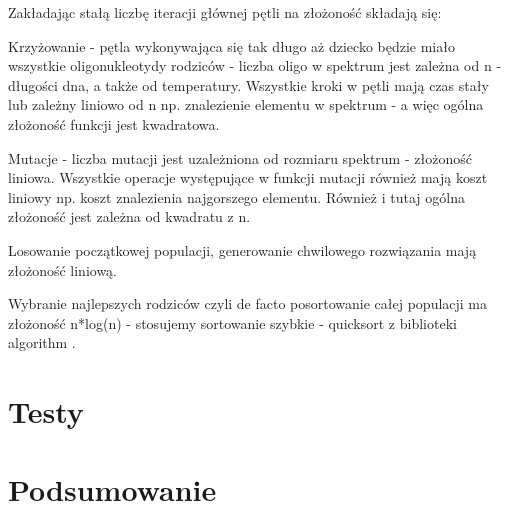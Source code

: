 \documentclass{article}
\begin{document}
Zakładając stałą liczbę iteracji głównej pętli na złożoność składają się:


Krzyżowanie - pętla wykonywająca się tak długo aż dziecko będzie miało
wszystkie oligonukleotydy rodziców - liczba oligo w spektrum jest zależna
od n - długości dna, a także od temperatury. Wszystkie kroki w pętli mają
czas stały lub zależny liniowo od n np. znalezienie elementu w spektrum -
a więc ogólna złożoność funkcji jest kwadratowa.


Mutacje - liczba mutacji jest uzależniona od rozmiaru spektrum - złożoność liniowa. Wszystkie operacje występujące w funkcji mutacji również
mają koszt liniowy np. koszt znalezienia najgorszego elementu. Również i tutaj ogólna złożoność jest zależna od kwadratu z n.
        
        
Losowanie początkowej populacji, generowanie chwilowego rozwiązania mają złożoność liniową.


Wybranie najlepszych rodziców czyli de facto posortowanie całej populacji ma złożoność n*log(n) - stosujemy sortowanie szybkie - quicksort z biblioteki algorithm .

\section{Testy}

\section{Podsumowanie}
\end{document}
